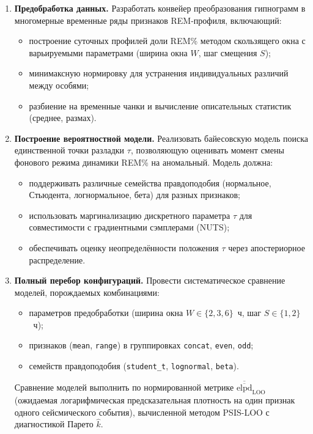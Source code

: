 \documentclass[14pt]{mmcs_article}
\begin{document}
\begin{enumerate}
	\item \textbf{Предобработка данных.}
	Разработать конвейер преобразования гипнограмм в
	многомерные временные ряды признаков REM-профиля,
	включающий:
	\begin{itemize}
		\item построение суточных профилей доли REM\%
		методом скользящего окна с варьируемыми
		параметрами (ширина окна $W$, шаг
		смещения $S$);
		\item минимаксную нормировку для устранения
		индивидуальных различий между особями;
		\item разбиение на временные чанки и
		вычисление описательных статистик
		(среднее, размах).
	\end{itemize}
	
	\item \textbf{Построение вероятностной модели.}
	Реализовать байесовскую модель поиска
	единственной точки разладки $\tau$, позволяющую
	оценивать момент смены фонового режима динамики
	REM\% на аномальный. Модель должна:
	\begin{itemize}
		\item поддерживать различные семейства
		правдоподобия (нормальное, Стьюдента,
		логнормальное, бета) для разных
		признаков;
		\item использовать маргинализацию дискретного
		параметра $\tau$ для совместимости с
		градиентными сэмплерами (NUTS);
		\item обеспечивать оценку неопределённости
		положения $\tau$ через апостериорное
		распределение.
	\end{itemize}
	
	\item \textbf{Полный перебор конфигураций.}
	Провести систематическое сравнение моделей,
	порождаемых комбинациями:
	\begin{itemize}
		\item параметров предобработки (ширина окна
		$W \in \{2, 3, 6\}$~ч, шаг $S \in
		\{1, 2\}$~ч);
		\item признаков (\texttt{mean}, \texttt{range})
		в группировках \texttt{concat},
		\texttt{even}, \texttt{odd};
		\item семейств правдоподобия
		(\texttt{student\_t},
		\texttt{lognormal}, \texttt{beta}).
	\end{itemize}
	Сравнение моделей выполнить по нормированной
	метрике $\overline{\overline{\mathrm{elpd}}}_{\mathrm{LOO}}$
	(ожидаемая логарифмическая предсказательная
	плотность на один признак одного сейсмического события), вычисленной методом
	PSIS-LOO с диагностикой Парето $\hat{k}$.
	

\end{enumerate}
\end{document}
